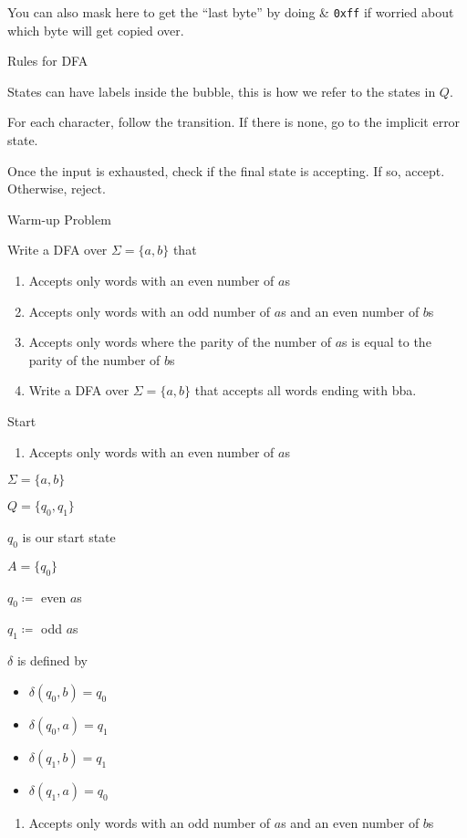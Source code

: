\documentclass{article}
\begin{document}
You can also mask here to get the ``last byte'' by doing \& \texttt{0xff} if
worried about which byte will get copied over.


Rules for DFA

States can have labels inside the bubble, this is how we refer to the
states in \(Q\).

For each character, follow the transition. If there is none, go to the
implicit error state.

Once the input is exhausted, check if the final state is accepting. If
so, accept. Otherwise, reject.

Warm-up Problem

Write a DFA over \(\Sigma = \{a,b\}\) that
\begin{enumerate}
   \item Accepts only words with an even number of \(a\)s 
   \item Accepts only words with an odd number of \(a\)s and an even number of \(b\)s 
   \item Accepts only words where the parity of the number of \(a\)s is equal to the parity of the number of \(b\)s 
   \item Write a DFA over \(\Sigma = \{a, b\}\) that accepts all words ending
with bba.
\end{enumerate}

Start

\begin{enumerate}
\item
Accepts only words with an even number of \(a\)s
\end{enumerate}

\(\Sigma = \{a,b\}\)

\(Q = \{q_0, q_1\}\)

\(q_0\) is our start state

\(A = \{q_0\}\)

\(q_0 \coloneqq\) even \(a\)s

\(q_1 \coloneqq\) odd \(a\)s

\(\delta\) is defined by
\begin{itemize}
    \item \(\delta(q_0, b) = q_0\)
    \item \(\delta(q_0, a) = q_1\)
    \item \(\delta(q_1, b) = q_1\)
    \item \(\delta(q_1, a) = q_0\)
\end{itemize}
 
\begin{enumerate}
\def\labelenumi{\arabic{enumi}.}
\setcounter{enumi}{1}
\item
  Accepts only words with an odd number of \(a\)s and an even number of
  \(b\)s
\end{enumerate}
\end{document}
